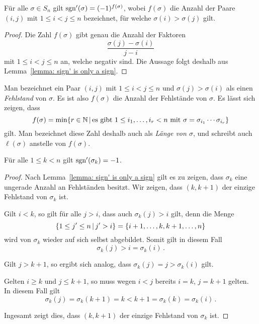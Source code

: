 \begin{corollary}
  Für alle $\sigma \in S_n$ gilt $\operatorname{sgn}'(\sigma) = (-1)^{f(\sigma)}$, wobei $f(\sigma)$ die Anzahl der Paare $(i,j)$ mit $1 \leq i < j \leq n$ bezeichnet, für welche $\sigma(i) > \sigma(j)$ gilt.
\end{corollary}

\begin{proof}
  Die Zahl $f(\sigma)$ gibt genau die Anzahl der Faktoren
  \[
    \frac{\sigma(j) - \sigma(i)}{j - i}
  \]
  mit $1 \leq i < j \leq n$ an, welche negativ sind.
  Die Aussage folgt deshalb aus Lemma~\ref{lemma: sign' is only a sign}.
\end{proof}

\begin{remark}
  Man bezeichnet ein Paar $(i,j)$ mit $1 \leq i < j \leq n$ und $\sigma(j) > \sigma(i)$ als einen \emph{Fehlstand} von $\sigma$.
  Es ist also $f(\sigma)$ die Anzahl der Fehlstände von $\sigma$.
  Es lässt sich zeigen, dass
  \[
      f(\sigma)
    = \min
      \{
        r \in \Natural
      \suchthat
        \text{es gibt $1 \leq i_1, \dotsc, i_r < n$ mit $\sigma = \sigma_{i_1} \dotsm \sigma_{i_r}$}
      \}
  \]
  gilt.
  Man bezeichnet diese Zahl deshalb auch als \emph{Länge von $\sigma$}, und schreibt auch $\ell(\sigma)$ anstelle von $f(\sigma)$.
\end{remark}

\begin{lemma}
\label{lemma: sign' of simple transposition}
  Für alle $1 \leq k < n$ gilt $\operatorname{sgn}'(\sigma_k) = -1$.
\end{lemma}

\begin{proof}
  Nach Lemma~\ref{lemma: sign' is only a sign} gilt es zu zeigen, dass $\sigma_k$ eine ungerade Anzahl an Fehlständen besitzt.
  Wir zeigen, dass $(k,k+1)$ der einzige Fehlstand von $\sigma_k$ ist.
  
  Gilt $i < k$, so gilt für alle $j > i$, dass auch $\sigma_k(j) > i$ gilt, denn die Menge
  \[
      \{
        1 \leq j' \leq n
        \suchthat
        j' > i
      \}
    = \{i+1, \dotsc, k, k+1, \dotsc, n\}
  \]
  wird von $\sigma_k$ wieder auf sich selbst abgebildet.
  Somit gilt in diesem Fall
  \[
      \sigma_k(j)
    > i
    = \sigma_k(i) \,.
  \]
  
  Gilt $j > k+1$, so ergibt sich analog, dass $\sigma_k(j) = j > \sigma_k(i)$ gilt.
  
  Gelten $i \geq k$ und $j \leq k+1$, so muss wegen $i < j$ bereits $i = k$, $j = k+1$ gelten.
  In diesem Fall gilt
  \[
      \sigma_k(j)
    = \sigma_k(k+1)
    = k
    < k+1
    = \sigma_k(k)
    = \sigma_k(i) \,.
  \]
  
  Ingesamt zeigt dies, dass $(k,k+1)$ der einzige Fehlstand von $\sigma_k$ ist.
\end{proof}



